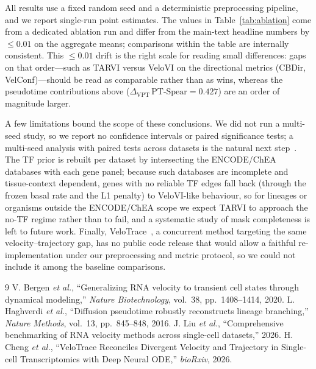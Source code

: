 \documentclass[11pt]{article}
\begin{document}
All results use a fixed random seed and a deterministic preprocessing pipeline, and
we report single-run point estimates. The values in Table~\ref{tab:ablation} come
from a dedicated ablation run and differ from the main-text headline numbers by
$\le 0.01$ on the aggregate means; comparisons within the table are internally
consistent. This $\le 0.01$ drift is the right scale for reading small differences:
gaps on that order---such as TARVI versus VeloVI on the directional metrics (CBDir,
VelConf)---should be read as comparable rather than as wins, whereas the pseudotime
contributions above ($\Delta_{\text{VPT}}\,\text{PT-Spear}=0.427$) are an order of
magnitude larger.

A few limitations bound the scope of these conclusions. We did not run a multi-seed
study, so we report no confidence intervals or paired significance tests; a
multi-seed analysis with paired tests across datasets is the natural next
step~\cite{liu2026benchmark}. The TF prior is rebuilt per dataset by intersecting the
ENCODE/ChEA databases with each gene panel; because such databases are incomplete and
tissue-context dependent, genes with no reliable TF edges fall back (through the
frozen basal rate and the L1 penalty) to VeloVI-like behaviour, so for lineages or
organisms outside the ENCODE/ChEA scope we expect TARVI to approach the no-TF regime
rather than to fail, and a systematic study of mask completeness is left to future
work. Finally, VeloTrace~\cite{cheng2026velotrace}, a concurrent method targeting the
same velocity--trajectory gap, has no public code release that would allow a faithful
re-implementation under our preprocessing and metric protocol, so we could not include
it among the baseline comparisons.

\begin{thebibliography}{9}
 V. Bergen \emph{et al.}, ``Generalizing RNA velocity to
transient cell states through dynamical modeling,'' \emph{Nature Biotechnology},
vol.~38, pp.~1408--1414, 2020.
 L. Haghverdi \emph{et al.}, ``Diffusion pseudotime
robustly reconstructs lineage branching,'' \emph{Nature Methods}, vol.~13,
pp.~845--848, 2016.
 J. Liu \emph{et al.}, ``Comprehensive benchmarking of RNA
velocity methods across single-cell datasets,'' 2026.
 H. Cheng \emph{et al.}, ``VeloTrace Reconciles
Divergent Velocity and Trajectory in Single-cell Transcriptomics with Deep Neural
ODE,'' \emph{bioRxiv}, 2026.
\end{thebibliography}
\end{document}

